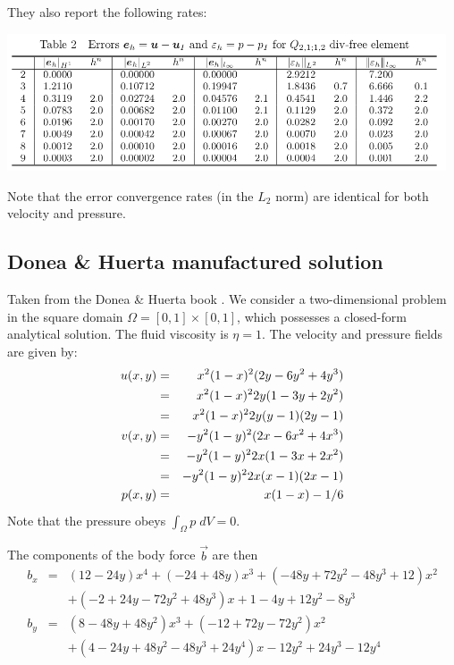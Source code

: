 They also report the following rates:

\begin{center}
\includegraphics[width=13cm]{python_codes/fieldstone_161/images/errors}
\end{center}

Note that the error convergence rates (in the $L_2$ norm)
are identical for both velocity and pressure. 

\subsection*{Donea \& Huerta manufactured solution}

Taken from the Donea \& Huerta book \cite{dohu03}. We consider a two-dimensional problem 
in the square domain $\Omega=[0,1]\times[0,1]$, which possesses a closed-form analytical 
solution. The fluid viscosity is $\eta=1$.
The velocity and pressure fields are given by:
\begin{eqnarray}
u(x,y) 
&=& x^2(1- x)^2 (2y - 6y^2 + 4y^3)  \nonumber\\
&=& x^2(1-x)^2 2y (1-3y+2y^2) \nonumber\\
&=& x^2(1-x)^2 2y (y-1)(2y-1) \nonumber\\
v(x,y) 
&=& -y^2 (1 - y)^2 (2x - 6x^2 + 4x^3) \nonumber\\
&=& -y^2 (1 - y)^2 2x (1-3x+2x^2) \nonumber\\
&=& -y^2 (1 - y)^2 2x (x-1)(2x-1) \nonumber\\
p(x,y) &=& x(1 -x)- 1/6 \nonumber 
\end{eqnarray}
Note that the pressure obeys $\int_{\Omega} p \; dV = 0$.

The components of the body force $\vec{b}$ are then
\begin{eqnarray}
b_x &=& (12 - 24y) x^4 + (-24 + 48y) x^3 + (-48y + 72y^2 - 48 y^3 + 12) x^2 \nonumber\\
    && + (-2 + 24y -72y^2+48y^3)x + 1-4y + 12y^2-8y^3 \nonumber\\ 
b_y &=& (8 - 48y + 48 y^2) x^3 + (-12 + 72y - 72y^2) x^2  \nonumber\\
    && + (4 - 24y + 48y^2 - 48y^3 + 24y^4) x - 12y^2 + 24y^3 - 12y^4  \nonumber
\end{eqnarray}

